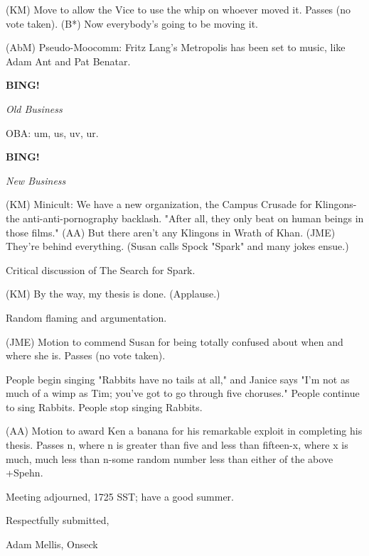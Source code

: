 \documentclass[12pt]{article}
\newcommand{\bing}{{\bf BING!} }
\newcommand{\goto}[1]{\bing \vskip 12pt \centerline{{\em{#1}}}}
\begin{document}
(KM) Move to allow the Vice to use the whip on whoever moved it. Passes (no vote taken). (B*) Now everybody's going to be moving it.

(AbM) Pseudo-Moocomm: Fritz Lang's Metropolis has been set to music, like Adam Ant and Pat Benatar.

\goto{Old Business}

OBA: um, us, uv, ur.

\goto{New Business}

(KM) Minicult: We have a new organization, the Campus Crusade for Klingons- the anti-anti-pornography backlash. "After all, they only beat on human beings in those films." (AA) But there aren't any Klingons in Wrath of Khan. (JME) They're behind everything. (Susan calls Spock "Spark" and many jokes ensue.)

Critical discussion of The Search for Spark.

(KM) By the way, my thesis is done. (Applause.)

Random flaming and argumentation.

(JME) Motion to commend Susan for being totally confused about when and where she is. Passes (no vote taken).

People begin singing "Rabbits have no tails at all," and Janice says "I'm not as much of a wimp as Tim; you've got to go through five choruses." People continue to sing Rabbits. People stop singing Rabbits.

(AA) Motion to award Ken a banana for his remarkable exploit in completing his thesis. Passes n, where n is greater than five and less than fifteen-x, where x is much, much less than n-some random number less than either of the above +Spehn.

\vspace{12pt}

\noindent
Meeting adjourned, 1725 SST; have a good summer.

\vspace{18pt}

\centerline{Respectfully submitted,}
\centerline{Adam Mellis, Onseck}
\end{document}
